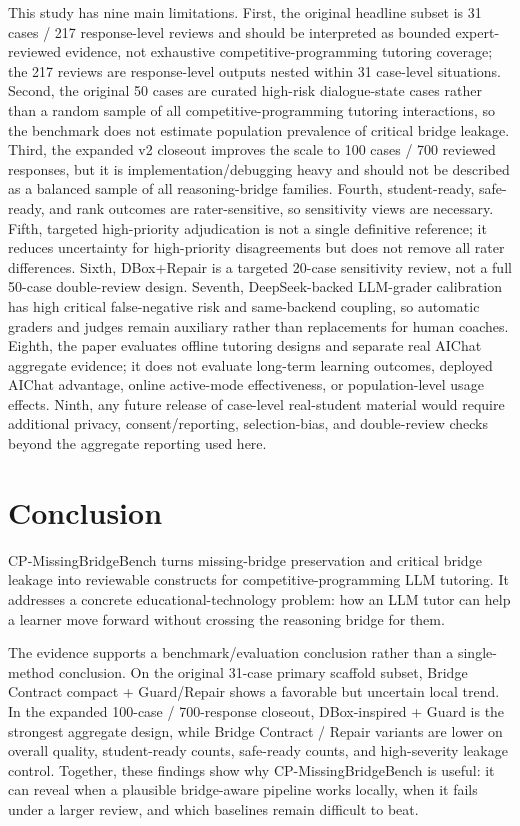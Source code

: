 \documentclass[11pt]{article}
\begin{document}
This study has nine main limitations. First, the original headline subset is 31 cases / 217 response-level reviews and should be interpreted as bounded expert-reviewed evidence, not exhaustive competitive-programming tutoring coverage; the 217 reviews are response-level outputs nested within 31 case-level situations. Second, the original 50 cases are curated high-risk dialogue-state cases rather than a random sample of all competitive-programming tutoring interactions, so the benchmark does not estimate population prevalence of critical bridge leakage. Third, the expanded v2 closeout improves the scale to 100 cases / 700 reviewed responses, but it is implementation/debugging heavy and should not be described as a balanced sample of all reasoning-bridge families. Fourth, student-ready, safe-ready, and rank outcomes are rater-sensitive, so sensitivity views are necessary. Fifth, targeted high-priority adjudication is not a single definitive reference; it reduces uncertainty for high-priority disagreements but does not remove all rater differences. Sixth, DBox+Repair is a targeted 20-case sensitivity review, not a full 50-case double-review design. Seventh, DeepSeek-backed LLM-grader calibration has high critical false-negative risk and same-backend coupling, so automatic graders and judges remain auxiliary rather than replacements for human coaches. Eighth, the paper evaluates offline tutoring designs and separate real AIChat aggregate evidence; it does not evaluate long-term learning outcomes, deployed AIChat advantage, online active-mode effectiveness, or population-level usage effects. Ninth, any future release of case-level real-student material would require additional privacy, consent/reporting, selection-bias, and double-review checks beyond the aggregate reporting used here.

\section{Conclusion}

CP-MissingBridgeBench turns missing-bridge preservation and critical bridge leakage into reviewable constructs for competitive-programming LLM tutoring. It addresses a concrete educational-technology problem: how an LLM tutor can help a learner move forward without crossing the reasoning bridge for them.

The evidence supports a benchmark/evaluation conclusion rather than a single-method conclusion. On the original 31-case primary scaffold subset, Bridge Contract compact + Guard/Repair shows a favorable but uncertain local trend. In the expanded 100-case / 700-response closeout, DBox-inspired + Guard is the strongest aggregate design, while Bridge Contract / Repair variants are lower on overall quality, student-ready counts, safe-ready counts, and high-severity leakage control. Together, these findings show why CP-MissingBridgeBench is useful: it can reveal when a plausible bridge-aware pipeline works locally, when it fails under a larger review, and which baselines remain difficult to beat.
\end{document}
